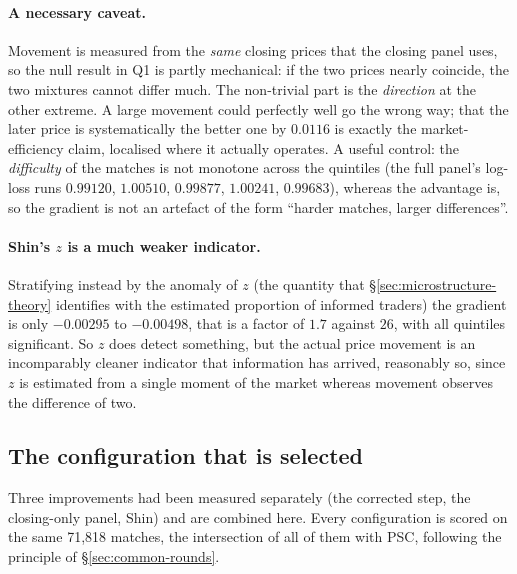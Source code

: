 \documentclass[12pt,a4paper,oneside]{report}
\renewcommand{\_}{\oldunderscore\allowbreak}
\theoremstyle{definition}
\theoremstyle{plain}
\theoremstyle{remark}
\begin{document}
\paragraph{A necessary caveat.} Movement is measured from the \emph{same} closing prices that the
closing panel uses, so the null result in Q1 is partly mechanical: if the two prices nearly
coincide, the two mixtures cannot differ much. The non-trivial part is the \emph{direction} at
the other extreme. A large movement could perfectly well go the wrong way; that the later price
is systematically the better one by $0.0116$ is exactly the market-efficiency claim, localised
where it actually operates. A useful control: the \emph{difficulty} of the matches is not
monotone across the quintiles (the full panel's log-loss runs $0.99120$, $1.00510$, $0.99877$,
$1.00241$, $0.99683$), whereas the advantage is, so the gradient is not an artefact of the form
``harder matches, larger differences''.

\paragraph{Shin's $z$ is a much weaker indicator.} Stratifying instead by the anomaly of $z$
(the quantity that \S\ref{sec:microstructure-theory} identifies with the estimated proportion
of informed traders) the gradient is only $-0.00295$ to $-0.00498$, that is a factor of $1.7$
against $26$, with all quintiles significant. So $z$ does detect something, but the actual
price movement is an incomparably cleaner indicator that information has arrived, reasonably
so, since $z$ is estimated from a single moment of the market whereas movement observes the
difference of two.

\subsection{The configuration that is selected}
\label{sec:res-config}

Three improvements had been measured separately (the corrected step, the closing-only panel,
Shin) and are combined here. Every configuration is scored on the same 71,818 matches, the
intersection of all of them with PSC, following the principle of \S\ref{sec:common-rounds}.
\end{document}

